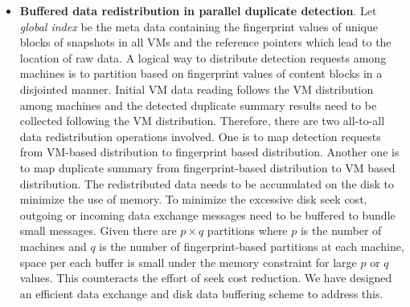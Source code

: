 \begin{itemize}
\item {\bf Buffered data redistribution in parallel duplicate detection}.  
Let {\em global index} be the meta data containing the fingerprint values of unique blocks of snapshots
in all VMs and  the reference pointers which lead to the location of raw data.
A logical way to distribute detection requests among machines is to partition based on fingerprint values of content blocks
in a  disjointed manner.
Initial VM data reading follows the VM distribution among machines and the detected duplicate summary results 
need to be collected following the VM distribution. 
Therefore, there are two all-to-all data redistribution operations involved.
One is to map detection requests from VM-based distribution to fingerprint based distribution.  
Another one  is to map duplicate summary from fingerprint-based distribution to VM based distribution.  
The redistributed data needs to be accumulated on the disk to minimize the use of memory.
To minimize the excessive disk seek cost, outgoing or incoming data exchange messages need to be buffered to bundle small messages.
Given there are $p\times q$ partitions where $p$ is the number of machines and $q$ is the number of fingerprint-based partitions
at each machine, space per each buffer  is small under the memory constraint for large $p$ or $q$ values.
This counteracts the effort of seek cost reduction.  
We have designed an efficient data exchange and disk data buffering  scheme to address this.


\end{itemize}



